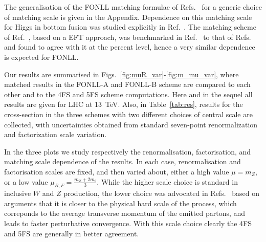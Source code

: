 \documentclass[12pt]{article}
\begin{document}
The generalisation of the FONLL matching formulae of
Refs.~\cite{Forte:2015hba,Forte:2016sja} for a generic choice of
matching scale is given in the Appendix.
Dependence on this
matching scale for Higgs in bottom fusion  was studied explicitly in
Ref.~\cite{Bonvini:2015pxa,Bonvini:2016fgf}. The matching scheme of 
Ref.~\cite{Bonvini:2015pxa,Bonvini:2016fgf}, based on a EFT approach,
was benchmarked in Ref.~\cite{deFlorian:2016spz} to that of
Refs.~\cite{Forte:2015hba,Forte:2016sja} and found to agree with it at
the percent level, hence a very similar dependence is expected for
FONLL.


Our results are summarised in
Figs.~\ref{fig:muR_var}-\ref{fig:m_mu_var}, where
matched results in the FONLL-A and FONLL-B scheme are compared to each
other and to the 4FS and 5FS scheme computations. Here and in the
sequel all results are given for LHC at 13~TeV.  Also, in
Table~\ref{tab:res}, results for the cross-section in the
three schemes with two different choices of central scale are
collected, with uncertainties obtained from
standard seven-point renormalization and factorization
scale variation. 


In the three plots
we study respectively the renormalisation, factorisation, and matching
scale dependence of the results. 
In each
case, renormalisation and factorisation scales are fixed, and then
varied about, either a high value $\mu=m_Z$, or a low value
$\mu_{R,F}=\frac{m_Z+2m_b}{3}$. While the higher scale choice is standard in
inclusive $W$ and $Z$ production, the lower choice was advocated in
Refs.~\cite{Maltoni:2012pa,Lim:2016wjo} based on arguments 
that it is closer to the physical hard scale of the process, which
correponds to the average transverse momentum of the emitted partons, 
and leads
to faster perturbative convergence. With this scale choice clearly the
4FS and 5FS are generally in better agreement.
\end{document}
